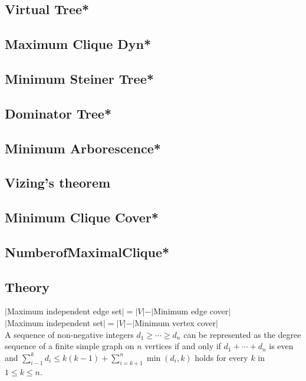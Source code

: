 \subsection{Virtual Tree*} %

\subsection{Maximum Clique Dyn*}
\subsection{Minimum Steiner Tree*} %

\subsection{Dominator Tree*} %

\subsection{Minimum Arborescence*} %

\subsection{Vizing's theorem}

\subsection{Minimum Clique Cover*} %

\subsection{NumberofMaximalClique*} %

\subsection{Theory}
\begin{footnotesize}
$|$Maximum independent edge set$|=|V|-|$Minimum edge cover$|$\\
$|$Maximum independent set$|=|V|-|$Minimum vertex cover$|$\\
A sequence of non-negative integers $d_1\ge\cdots\ge d_n$ can be represented as the degree sequence of a finite simple graph on $n$ vertices if and only if $d_1+\cdots+d_n$ is even and $\displaystyle\sum_{i-1}^kd_i\le k(k-1)+\displaystyle\sum_{i=k+1}^n\min(d_i,k)$ holds for every $k$ in $1\le k\le n$.
\end{footnotesize}


